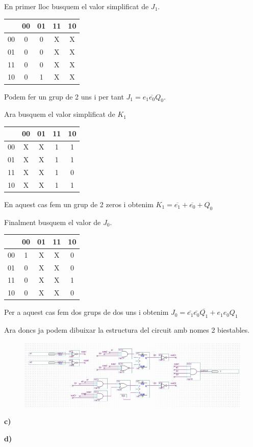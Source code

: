 \documentclass[12pt, a4papre]{article}
\begin{document}
	En primer lloc busquem el valor simplificat de $J_1$.
	
	\begin{table}[!h]
		\centering
		\begin{tabular}{| c | c | c | c | c |}
			\hline
				&00	&01	&11	&10	\\
			\hline
			00	&0	&0	&X	&X	\\
			\hline
			01	&0	&0	&X	&X	\\
			\hline
			11	&0	&0	&X	&X	\\
			\hline
			10	&0	&1	&X	&X	\\
			\hline
		\end{tabular}
	\end{table}
	
	Podem fer un grup de 2 uns i per tant $J_1 = e_1\overline{e_0}Q_0$.
	
	Ara busquem el valor simplificat de $K_1$
	
	\begin{table}[!h]
		\centering
		\begin{tabular}{| c | c | c | c | c |}
			\hline
				&00	&01	&11	&10	\\
			\hline
			00	&X	&X	&1	&1	\\
			\hline
			01	&X	&X	&1	&1	\\
			\hline
			11	&X	&X	&1	&0	\\
			\hline
			10	&X	&X	&1	&1	\\
			\hline
		\end{tabular}
	\end{table}
	
	En aquest cas fem un grup de 2 zeros i obtenim $K_1 = \overline{e_1} + \overline{e_0} + Q_0$
	
	Finalment busquem el valor de $J_0$.
	
	\begin{table}[!h]
		\centering
		\begin{tabular}{| c | c | c | c | c |}
			\hline
				&00	&01	&11	&10	\\
			\hline
			00	&1	&X	&X	&0	\\
			\hline
			01	&0	&X	&X	&0	\\
			\hline
			11	&0	&X	&X	&1	\\
			\hline
			10	&0	&X	&X	&0	\\
			\hline
		\end{tabular}
	\end{table}
	
	Per a aquest cas fem dos grups de dos uns i obtenim $J_0 =  \bar{e_1}\bar{e_0}\overline{Q_1} + e_1e_0Q_1$
	
	Ara doncs ja podem dibuixar la estructura del circuit amb nomes 2 biestables.
	
	\begin{figure}[H]
		\begin{center}
		\includegraphics[width=140mm]{DisenyB.jpeg}
		\end{center}
	\end{figure}
	
	\textbf{c)}
	
	\textbf{d)}
	
\end{document}
